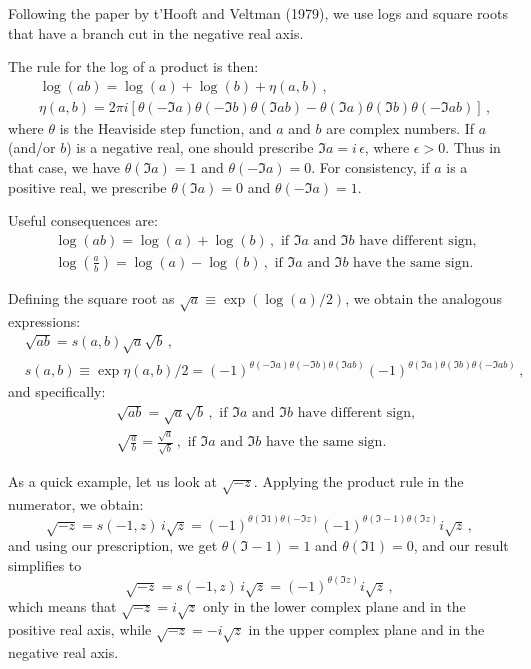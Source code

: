 \documentclass[twoside]{article}
\begin{document}
Following the paper by t'Hooft and Veltman (1979), we use logs and square roots that have a branch cut in the negative real axis.

The rule for the log of a product is then:
\begin{equation}
\begin{split}
& \log(a b) = \log(a) + \log(b) + \eta(a,b)\,, \\
& \eta(a,b) = 2 \pi i \left[ \theta(- \Im a) \theta(- \Im b) \theta(\Im ab) - \theta(\Im a) \theta(\Im b) \theta(-\Im ab) \right]\,,
\end{split}
\end{equation}
where $\theta$ is the Heaviside step function, and $a$ and $b$ are complex numbers. If $a$ (and/or $b$) is a negative real, one should prescribe $\Im a = i \, \epsilon$, where $\epsilon>0$. Thus in that case, we have $\theta(\Im a)=1$ and $\theta(-\Im a)=0$. For consistency, if $a$ is a positive real, we prescribe $\theta(\Im a)=0$ and $\theta(-\Im a)=1$.

Useful consequences are:
\begin{align}
& \log(a b) = \log(a) + \log(b) \,, \text{ if $\Im a$ and $\Im b$ have different sign,}\\
& \log(\frac{a}{b}) = \log(a) - \log(b) \,, \text{ if $\Im a$ and $\Im b$ have the same sign.}
\end{align}

Defining the square root as $\sqrt{a} \equiv \exp(\log(a)/2)$, we obtain the analogous expressions:
\begin{equation}
\begin{split}
& \sqrt{a b} = s(a,b)\sqrt{a}\sqrt{b}\,, \\
& s(a,b) \equiv \exp{\eta(a,b)/2} =(-1)^{\theta(- \Im a) \theta(- \Im b) \theta(\Im ab)} (-1)^{\theta(\Im a) \theta(\Im b) \theta(-\Im ab)}
\,,
\end{split}
\end{equation}
and specifically:
\begin{align}
& \sqrt{a b} = \sqrt{a}  \sqrt{b} \,, \text{ if $\Im a$ and $\Im b$ have different sign,}\\
& \sqrt{\frac{a}{b}} = \frac{\sqrt{a}}{\sqrt{b}}\,, \text{ if $\Im a$ and $\Im b$ have the same sign.}
\end{align}

As a quick example, let us look at $\sqrt{-z}$.
Applying the product rule in the numerator, we obtain:
\begin{equation}
\sqrt{-z} = s(-1,z)\, i \sqrt{z} =  (-1)^{\theta(\Im 1) \theta(- \Im z)} (-1)^{\theta(\Im -1) \theta(\Im z)} i \sqrt{z}\,,
\end{equation}
and using our prescription, we get $\theta(\Im -1) = 1$ and $\theta(\Im 1) = 0$, and our result simplifies to 
\begin{equation}
\sqrt{-z} = s(-1,z)\, i \sqrt{z} =  (-1)^{\theta(\Im z)} i \sqrt{z}\,,
\end{equation}
which means that $\sqrt{-z} = i\sqrt{z}$ only in the lower complex plane and in the positive real axis, while $\sqrt{-z} = -i\sqrt{z}$ in the upper complex plane and in the negative real axis.
\end{document}
